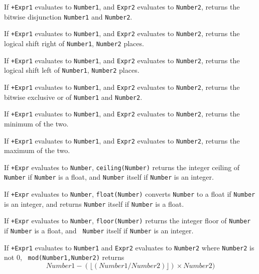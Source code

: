 \begin{description}

%
If {\tt +Expr1} evaluates to {\tt Number1}, and {\tt Expr2} evaluates
to {\tt Number2}, returns the bitwise disjunction {\tt Number1} and
{\tt Number2}.

%
If {\tt +Expr1} evaluates to {\tt Number1}, and {\tt Expr2} evaluates
to {\tt Number2}, returns the logical shift right of {\tt Number1},
{\tt Number2} places.

%
If {\tt +Expr1} evaluates to {\tt Number1}, and {\tt Expr2}
evaluates to {\tt Number2}, returns the logical shift left of 
{\tt Number1}, {\tt Number2} places.

%
If {\tt +Expr1} evaluates to {\tt Number1}, and {\tt Expr2}
evaluates to {\tt Number2}, returns the bitwise exclusive or of 
{\tt Number1} and {\tt Number2}.

%
If {\tt +Expr1} evaluates to {\tt Number1}, and
{\tt Expr2} evaluates to {\tt Number2}, returns the minimum of the
two.

%
If {\tt +Expr1} evaluates to {\tt Number1}, and
{\tt Expr2} evaluates to {\tt Number2}, returns the maximum of the
two.

%
If {\tt +Expr} evaluates to {\tt Number}, {\tt ceiling(Number)}
returns the integer ceiling of {\tt Number} if {\tt Number} is a
float, and {\tt Number} itself if {\tt Number} is an integer.

%
If {\tt +Expr} evaluates to {\tt Number}, {\tt float(Number)} converts
{\tt Number} to a float if {\tt Number} is an integer, and returns
{\tt Number} itself if {\tt Number} is a float.

%
If {\tt +Expr} evaluates to {\tt Number}, {\tt floor(Number)} returns
the integer floor of {\tt Number} if {\tt Number} is a float, and {\tt
  Number} itself if {\tt Number} is an integer.

%
If {\tt +Expr1} evaluates to {\tt Number1} and {\tt Expr2} evaluates
to {\tt Number2} where {\tt Number2} is not 0, {\tt
mod(Number1,Number2)} returns
\[
	Number1 - (\lfloor (Number1 / Number2) \rfloor) \times Number2)
\]


\end{description}
